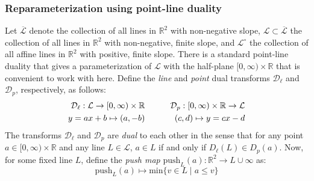 \documentclass{article} %
\begin{document}

\subsubsection*{Reparameterization using point-line duality}\label{sec:fibered_barcode_reparam}
Let $\overline{\mathcal{L}}$ denote the collection of all lines in $\mathbb{R}^2$ with non-negative slope, $\mathcal{L} \subset \overline{\mathcal{L}}$ the collection of all lines in $\mathbb{R}^2$ with non-negative, finite slope, and $\mathcal{L}^\circ$ the collection of all affine lines in $\mathbb{R}^2$ with positive, finite slope. There is a standard point-line duality that gives a parameterization of $\mathcal{L}$ with the half-plane $[0, \infty) \times \mathbb{R}$ that is convenient to work with here. Define the \emph{line} and \emph{point} dual transforms $\mathcal{D}_{\ell}$ and $\mathcal{D}_p$, respectively, as follows: 
\begin{equation}
	\begin{aligned}
\mathcal{D}_{\ell}: \mathcal{L} \rightarrow[0, \infty) \times \mathbb{R} & \quad \hfill \quad & \mathcal{D}_{p}:[0, \infty) \times \mathbb{R} \rightarrow \mathcal{L} \\
y=a x+b \mapsto(a,-b) &\quad \hfill \quad & (c, d) \mapsto y=c x-d
\end{aligned}
\end{equation}
The transforms $\mathcal{D}_{\ell}$ and $\mathcal{D}_p$ are \emph{dual} to each other in the sense that for any point $a \in [0, \infty) \times \mathbb{R}$ and any line $L \in \mathcal{L}$, $a \in L$ if and only if $D_\ell(L) \in D_{p}(a)$. Now, for some fixed line $L$, define  the \emph{push map} $\mathrm{push}_L(a):  \mathbb{R}^2 \to L \cup \infty$ as: 
\begin{equation}
	\mathrm{push}_L(a) \mapsto \mathrm{min}\{ v \in L \mid a \leq v \}
\end{equation}
\end{document}
